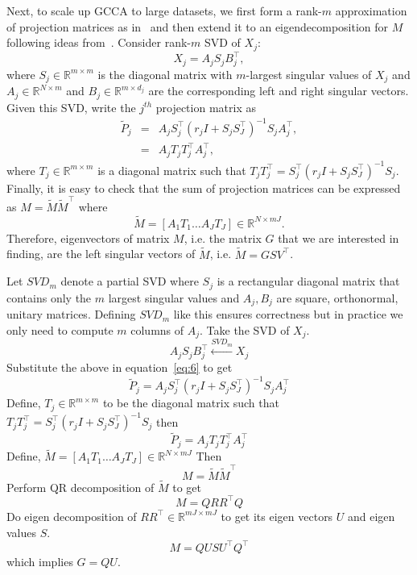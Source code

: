\documentclass[11pt]{article}
\newcommand{\R}{\mathbb{R}}
\begin{document}
Next, to scale up GCCA to large datasets, we first form a rank-$m$ approximation of projection matrices as in~\cite{arora2012kernel} and then extend it to an eigendecomposition for $M$ following ideas from~\cite{savostyanov}. Consider rank-$m$ SVD of $X_j$:
$$X_j = A_{j} S_{j} B^\top_{j},$$
where $S_j \in \R^{m \times m}$ is the diagonal matrix with $m$-largest singular values of $X_j$ and $A_j \in \R^{N \times m}$ and $B_j \in \R^{m \times d_j}$ are the corresponding left and right singular vectors. Given this SVD, write the $j^{th}$ projection matrix as 
\begin{eqnarray}
\widetilde{P}_j &=& A_j S_j^\top(r_j I + S_j S_J^\top)^{-1}S_j A_j^\top, \nonumber \\
&=& A_j T_j T_j^\top A_j^\top, \nonumber
\end{eqnarray}
where $T_j \in \mathbb{R}^{m \times m}$ is a diagonal matrix such that 
$T_jT_j^\top = S_j^\top(r_j I + S_j S_J^\top)^{-1}S_j$. Finally, it is easy to check that the sum of projection matrices can be expressed as $M = \tilde{M} \tilde{M}^\top$
where $$\tilde{M} = \left[ A_1T_1 \ldots A_JT_J \right] \in \mathbb{R}^{N
  \times mJ}.$$
Therefore, eigenvectors of matrix $M$, i.e. the matrix $G$ that we are interested in finding, are the left singular vectors of $\tilde{M}$, i.e. $\tilde{M}=GSV^\top$. 


Let $SVD_m$ denote a partial SVD where $S_j$ is a rectangular diagonal
matrix that contains only the $m$ largest singular values and $A_j, B_j$
are square, orthonormal, unitary matrices. Defining $SVD_m$ like this
ensures correctness but in practice we only need to compute $m$
columns of $A_j$. Take the SVD of $X_j$.
$$A_{j} S_{j} B^\top_{j} \xleftarrow{SVD_{m}} X_j$$
 Substitute the above in equation~\ref{eq:6} to get 
$$\widetilde{P}_j = A_j S_j^\top(r_j I + S_j S_J^\top)^{-1}S_j A_j^\top$$ 
Define, $T_j \in \mathbb{R}^{m \times m}$ to be the diagonal matrix such that
$T_jT_j^\top = S_j^\top(r_j I + S_j S_J^\top)^{-1}S_j $ then
$$\widetilde{P}_j = A_j T_j T_j^\top A_j^\top$$
Define, $\tilde{M} = \left[ A_1T_1 \ldots A_JT_J \right] \in \mathbb{R}^{N
  \times mJ}$
Then 
$$M = \tilde{M} \tilde{M}^\top$$
Perform QR decomposition of $\tilde{M}$ to get
$$M = Q R R^\top Q$$
Do eigen decomposition of $R R^\top \in \mathbb{R}^{mJ \times mJ}$
to get its eigen vectors $U$ and eigen values $S$.
$$M = Q U S U^\top Q^\top$$
 which implies $G = QU$. 
\end{document}
